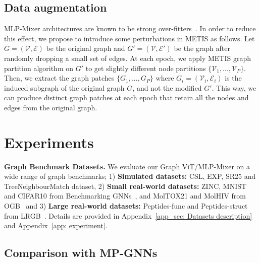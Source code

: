 \documentclass{article}
\begin{document}
\subsection{Data augmentation}\label{subsec: data augmentation}
MLP-Mixer architectures are known to be strong over-fitters~\citep{liu2021gmlp}. 
In order to reduce this effect, we propose to introduce some perturbations in METIS as follows. Let $G=(\mathcal{V}, \mathcal{E})$ be the original graph and $G'=(\mathcal{V}, \mathcal{E}')$ be the graph after randomly dropping a small set of edges. At each epoch, we apply METIS graph partition algorithm on $G'$ to get slightly different node partitions $\{\mathcal{V}_1, ..., \mathcal{V}_P\}$. Then, we extract the graph patches $\{G_1, ..., G_P\}$ where $G_i = (\mathcal{V}_i, \mathcal{E}_i)$ is the induced subgraph of the original graph $G$, and not the modified $G'$. This way, we can produce distinct graph patches at each epoch that retain all the nodes and edges from the original graph.


\section{Experiments}
{\bf Graph Benchmark Datasets.} 
We evaluate our Graph ViT/MLP-Mixer on a wide range of graph benchmarks; 1) \textbf{Simulated datasets:} CSL, EXP, SR25 and TreeNeighbourMatch dataset,
2) \textbf{Small real-world datasets:} ZINC, MNIST and CIFAR10 from Benchmarking GNNs~\citep{dwivedi2020benchmarking}, and MolTOX21 and MolHIV from OGB~\citep{hu2020open} and 3) \textbf{Large real-world datasets:} Peptides-func and Peptides-struct from LRGB~\citep{dwivedi2022long}. Details are provided in Appendix~\ref{app_sec: Datasets description} and Appendix~\ref{app: experiment}.


\subsection{Comparison with MP-GNNs}
\end{document}
